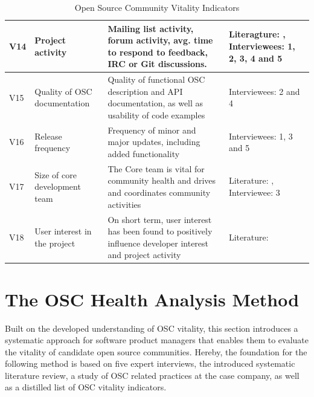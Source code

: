 \documentclass[final,5p,times,twocolumn]{elsarticle}
\begin{document}
\begin{table}
\begin{tabular}{|p{0.5cm}|p{2.5cm}|p{10cm}|p{3.5cm}|}
    V14 &                   Project activity                           & Mailing list activity, forum activity, avg. time to respond to feedback, IRC or Git discussions. & Literagture: \cite{Subramaniam2009}, Interviewees: 1, 2, 3, 4 and 5                           \\ \hline
    V15 &                   Quality of OSC documentation               & Quality of functional OSC description and API documentation, as well as usability of code examples   & Interviewees: 2 and 4    \\ \hline
    V16 &                   Release frequency                          & Frequency of minor and major updates, including added functionality    & Interviewees: 1, 3 and 5   \\ \hline
    V17 &                   Size of core development team              & The Core team is vital for community health and drives and coordinates community activities                                                               & Literature: \cite{Torres2011} , Interviewee: 3   \\ \hline
    V18 &                   User interest in the project               & On short term, user interest has been found to positively influence developer interest and project activity                                                                & Literature: \cite{Subramaniam2009} \\ \hline
    \end{tabular}
    \caption{Open Source Community Vitality Indicators}
\end{table}


\section{The OSC Health Analysis Method}
\label{OSC_method_section}
Built on the developed understanding of OSC vitality, this section introduces a systematic approach for software product managers that enables them to evaluate the vitality of candidate open source communities. Hereby, the foundation for the following method is based on five expert interviews, the introduced systematic literature review, a study of OSC related practices at the case company, as well as a distilled list of OSC vitality indicators.
\end{document}
